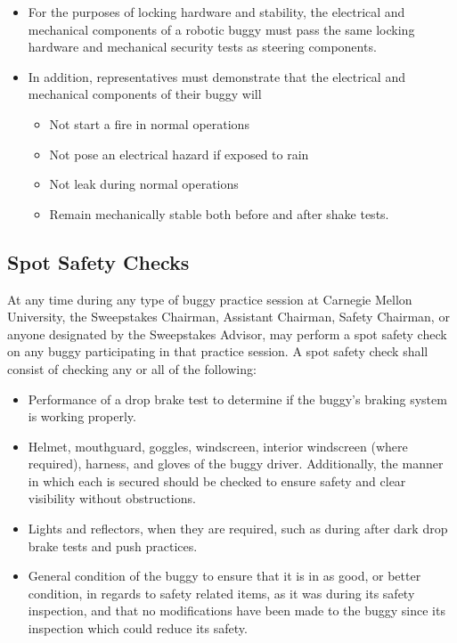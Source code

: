 \begin{itemize}
	\item
	For the purposes of locking hardware and stability, the electrical and mechanical components of a robotic buggy must pass the same locking hardware and mechanical security tests as steering components. 
	\item
	In addition, representatives must demonstrate that the electrical and mechanical components of their buggy will
	\begin{itemize}
		\item
		Not start a fire in normal operations
		\item
		Not pose an electrical hazard if exposed to rain
		\item
		Not leak during normal operations
		\item
		Remain mechanically stable both before and after shake tests. 
	\end{itemize}
	
\end{itemize}

\subsection{Spot Safety Checks}
\label{subsec:Spot Safety}

	At any time during any type of buggy practice session at Carnegie Mellon University, the Sweepstakes Chairman, Assistant Chairman, Safety Chairman, or anyone designated by the Sweepstakes Advisor, may perform a spot safety check on any buggy participating in that practice session. A spot safety check shall consist of checking any or all of the following:

	\begin{itemize}

		\item Performance of a drop brake test to determine if the buggy's braking system is working properly.

		\item Helmet, mouthguard, goggles, windscreen, interior windscreen (where required), harness, and gloves of the buggy driver. Additionally, the manner in which each is secured should be checked to ensure safety and clear visibility without obstructions.

		\item Lights and reflectors, when they are required, such as during after dark drop brake tests and push practices.

		\item General condition of the buggy to ensure that it is in as good, or better condition, in regards to safety related items, as it was during its safety inspection, and that no modifications have been made to the buggy since its inspection which could reduce its safety.

	\end{itemize}

